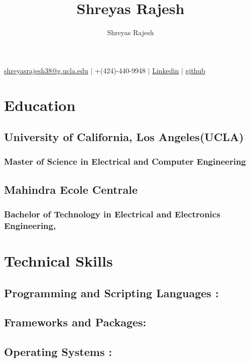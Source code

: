\documentclass{article}
\makeatletter
\renewcommand{\maketitle}{

\begin{center}
	{\huge\bfseries
	\theauthor}

	\vspace{0.2em}
	\footnotesize
	\href{mailto:shreyasrajesh38@g.ucla.edu}{shreyasrajesh38@g.ucla.edu} $\vert$ +(424)-440-9948 $\vert$ \href{http://www.linkedin.com/in/shreyasrajesh38}{Linkedin} $\vert$ \href{https://github.com/shreyasrajesh0308}{github}
\end{center}
}
\makeatother
\begin{document}
\title{\large\textbf{Shreyas Rajesh}}
\author{Shreyas Rajesh}

\maketitle

\section{Education}

\subsection{University of California, Los Angeles(UCLA)  \null\hfill{}}
\subsubsection{Master of Science in Electrical and Computer Engineering}

\subsection{Mahindra Ecole Centrale \hfill\null{}}
\subsubsection{Bachelor of Technology in Electrical and Electronics Engineering,    }


\section{Technical Skills}

\subsection{Programming and Scripting Languages : }
\vspace{0.5em}
\subsection{Frameworks and Packages: }
\vspace{0.5em}
\subsection{Operating Systems : }
\end{document}
